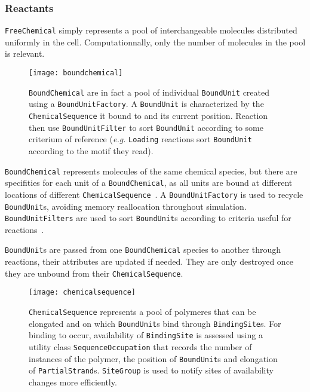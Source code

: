 
\subsubsection{Reactants}


\texttt{FreeChemical} simply represents a pool of interchangeable molecules distributed uniformly in the cell. Computationnally, only the number of molecules in the pool is relevant.


\begin{figure}[!h]
  \centering
  \texttt{[image: boundchemical]}
  \caption{\texttt{BoundChemical} are in fact a pool of individual \texttt{BoundUnit} created using a \texttt{BoundUnitFactory}. A \texttt{BoundUnit} is characterized by the \texttt{ChemicalSequence} it bound to and its current position. Reaction then use \texttt{BoundUnitFilter} to sort \texttt{BoundUnit} according to some criterium of reference (\textit{e.g.} \texttt{Loading} reactions sort \texttt{BoundUnit} according to the motif they read).}
  \label{fig:det_bound_chemical}
\end{figure}

\texttt{BoundChemical} represents molecules of the same chemical species, but there are specifities for each unit of a \texttt{BoundChemical}, as all units are bound at different locations of different \texttt{ChemicalSequence}~. A \texttt{BoundUnitFactory} is used to recycle \texttt{BoundUnit}s, avoiding memory reallocation throughout simulation. \texttt{BoundUnitFilters} are used to sort \texttt{BoundUnit}s according to criteria useful for reactions~.


\texttt{BoundUnit}s are passed from one \texttt{BoundChemical} species to another through reactions, their attributes are updated if needed. They are only destroyed once they are unbound from their \texttt{ChemicalSequence}.


\begin{figure}[!h]
  \centering
  \texttt{[image: chemicalsequence]}
  \caption{\texttt{ChemicalSequence} represents a pool of polymeres that can be elongated and on which \texttt{BoundUnit}s bind through \texttt{BindingSite}s. For binding to occur, availability of \texttt{BindingSite} is assessed using a utility class \texttt{SequenceOccupation} that records the number of instances of the polymer, the position of \texttt{BoundUnit}s and elongation of \texttt{PartialStrand}s. \texttt{SiteGroup} is used to notify sites of availability changes more efficiently.}
  \label{fig:det_chemical_sequence}
\end{figure}

